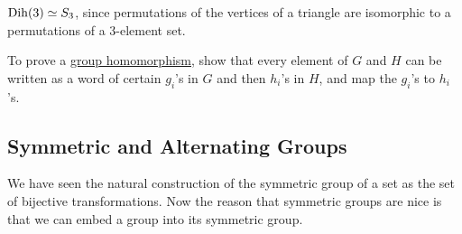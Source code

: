   \begin{example}
    \label{ex:groups-of-order-3}
    $\operatorname{Dih}(3) \simeq S_{3}$, since permutations of the vertices of a triangle are isomorphic to a permutations of a 3-element set. 
  \end{example}  

  \begin{theorem}[Tip]
    \label{thm:tip}
    To prove a \hyperref[def:group-homomorphism]{group homomorphism}, show that every element of $G$ and $H$ can be written as a word of certain $g_i$'s in $G$ and then $h_i$'s in $H$, and map the $g_i$'s to $h_i$'s. 
  \end{theorem}

\subsection{Symmetric and Alternating Groups}

  We have seen the natural construction of the symmetric group of a set as the set of bijective transformations. Now the reason that symmetric groups are nice is that we can embed a group into its symmetric group. 

